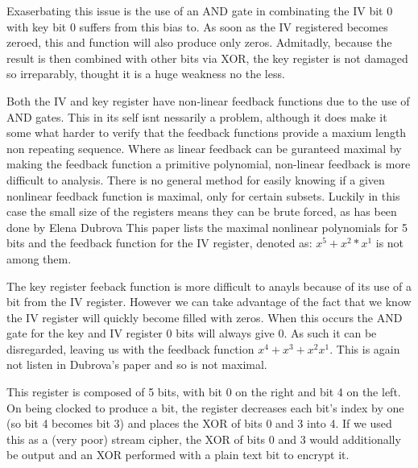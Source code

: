 \documentclass{report}
\begin{document}
Exaserbating this issue is the use of an AND gate in combinating the IV bit 0 with key bit 0 suffers from this bias to. As soon as the IV registered becomes zeroed, this and function will also produce only zeros. Admitadly, because the result is then combined with other bits via XOR, the key register is not damaged so irreparably, thought it is a huge weakness no the less.

Both the IV and key register have non-linear feedback functions due to the use of AND gates. This in its self isnt nessarily a problem, although it does make it some what harder to verify that the feedback functions provide a maxium length non repeating sequence. Where as linear feedback can be guranteed maximal by making the feedback function a primitive polynomial, non-linear feedback is more difficult to analysis. There is no general method for easily knowing if a given nonlinear feedback function is maximal, only for certain subsets. %
Luckily in this case the small size of the registers means they can be brute forced, as has been done by Elena Dubrova%
This paper lists the maximal nonlinear polynomials for 5 bits and the feedback function for the IV register, denoted as: $x^5+x^2*x^1$ is not among them. 

The key register feeback function is more difficult to anayls because of its use of a bit from the IV register. However we can take advantage of the fact that we know the IV register will quickly become filled with zeros. When this occurs the  AND gate for the key and IV register 0 bits will always give 0. As such it can be disregarded, leaving us with the feedback function $x^4+x^3+x^2x^1$. This is again not listen in Dubrova's paper and so is not maximal.%

\begin{figure}[h]
\end{figure}


This register is composed of 5 bits, with bit 0 on the right and bit 4 on the left. On being clocked to produce a bit, the register decreases each bit's index by one (so bit 4 becomes bit 3) and places the XOR of bits 0 and 3 into 4. If we used this as a (very poor) stream cipher, the XOR of bits 0 and 3 would additionally be output and an XOR performed with a plain text bit to encrypt it.
\end{document}
